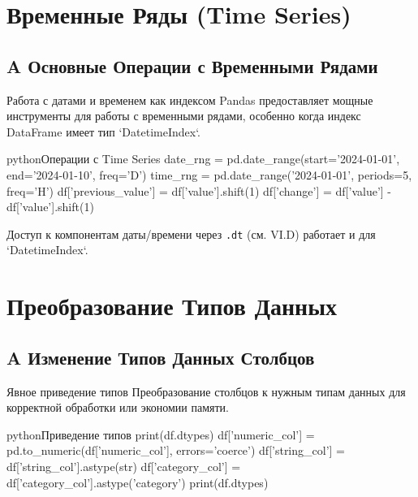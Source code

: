 \section{Временные Ряды (Time Series)}

\subsection{A Основные Операции с Временными Рядами}

\begin{myblock}{Работа с датами и временем как индексом}
    Pandas предоставляет мощные инструменты для работы с временными рядами, особенно когда индекс DataFrame имеет тип `DatetimeIndex`.
    \begin{codebox}{python}{Операции с Time Series}
    date_rng = pd.date_range(start='2024-01-01', end='2024-01-10', freq='D')
    time_rng = pd.date_range('2024-01-01', periods=5, freq='H')
    df['previous_value'] = df['value'].shift(1)
    df['change'] = df['value'] - df['value'].shift(1)
    \end{codebox}
    Доступ к компонентам даты/времени через \texttt{.dt} (см. VI.D) работает и для `DatetimeIndex`.
\end{myblock}

\section{Преобразование Типов Данных}

\subsection{A Изменение Типов Данных Столбцов}

\begin{myblock}{Явное приведение типов}
    Преобразование столбцов к нужным типам данных для корректной обработки или экономии памяти.
    \begin{codebox}{python}{Приведение типов}
    print(df.dtypes)
    df['numeric_col'] = pd.to_numeric(df['numeric_col'], errors='coerce')
    df['string_col'] = df['string_col'].astype(str)
    df['category_col'] = df['category_col'].astype('category')
    print(df.dtypes)
    \end{codebox}
\end{myblock}

